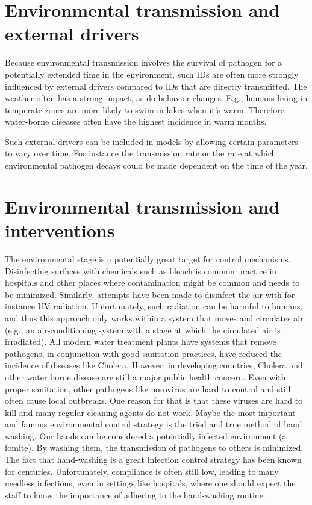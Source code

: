\documentclass[]{book}
\theoremstyle{definition}
\theoremstyle{definition}
\theoremstyle{definition}
\theoremstyle{remark}
\begin{document}
\hypertarget{environmental-transmission-and-external-drivers}{%
\section{Environmental transmission and external
drivers}\label{environmental-transmission-and-external-drivers}}

Because environmental transmission involves the survival of pathogen for
a potentially extended time in the environment, such IDs are often more
strongly influenced by external drivers compared to IDs that are
directly transmitted. The weather often has a strong impact, as do
behavior changes. E.g., humans living in temperate zones are more likely
to swim in lakes when it's warm. Therefore water-borne diseases often
have the highest incidence in warm months.

Such external drivers can be included in models by allowing certain
parameters to vary over time. For instance the transmission rate or the
rate at which environmental pathogen decays could be made dependent on
the time of the year.

\hypertarget{environmental-transmission-and-interventions}{%
\section{Environmental transmission and
interventions}\label{environmental-transmission-and-interventions}}

The environmental stage is a potentially great target for control
mechanisms. Disinfecting surfaces with chemicals such as bleach is
common practice in hospitals and other places where contamination might
be common and needs to be minimized. Similarly, attempts have been made
to disinfect the air with for instance UV radiation. Unfortunately, such
radiation can be harmful to humans, and thus this approach only works
within a system that moves and circulates air (e.g., an air-conditioning
system with a stage at which the circulated air is irradiated). All
modern water treatment plants have systems that remove pathogens, in
conjunction with good sanitation practices, have reduced the incidence
of diseases like Cholera. However, in developing countries, Cholera and
other water borne disease are still a major public health concern. Even
with proper sanitation, other pathogens like norovirus are hard to
control and still often cause local outbreaks. One reason for that is
that these viruses are hard to kill and many regular cleaning agents do
not work. Maybe the most important and famous environmental control
strategy is the tried and true method of hand washing. Our hands can be
considered a potentially infected environment (a fomite). By washing
them, the transmission of pathogens to others is minimized. The fact
that hand-washing is a great infection control strategy has been known
for centuries. Unfortunately, compliance is often still low, leading to
many needless infections, even in settings like hospitals, where one
should expect the staff to know the importance of adhering to the
hand-washing routine.
\end{document}
